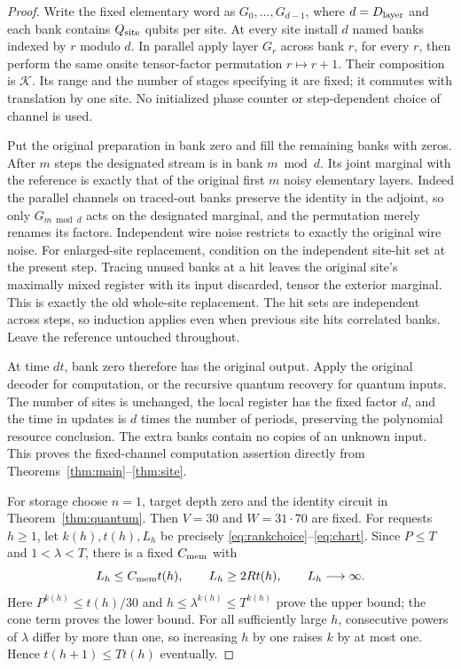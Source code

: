 \begin{proof}
Write the fixed elementary word as $G_0,\ldots,G_{d-1}$, where $d=D_{\rm layer}$ and each bank contains $Q_{\rm site}$ qubits per site. At every site install $d$ named banks indexed by $r$ modulo $d$. In parallel apply layer $G_r$ across bank $r$, for every $r$, then perform the same onsite tensor-factor permutation $r\mapsto r+1$. Their composition is $\mathcal K$. Its range and the number of stages specifying it are fixed; it commutes with translation by one site. No initialized phase counter or step-dependent choice of channel is used.

Put the original preparation in bank zero and fill the remaining banks with zeros. After $m$ steps the designated stream is in bank $m\bmod d$. Its joint marginal with the reference is exactly that of the original first $m$ noisy elementary layers. Indeed the parallel channels on traced-out banks preserve the identity in the adjoint, so only $G_{m\bmod d}$ acts on the designated marginal, and the permutation merely renames its factors. Independent wire noise restricts to exactly the original wire noise. For enlarged-site replacement, condition on the independent site-hit set at the present step. Tracing unused banks at a hit leaves the original site's maximally mixed register with its input discarded, tensor the exterior marginal. This is exactly the old whole-site replacement. The hit sets are independent across steps, so induction applies even when previous site hits correlated banks. Leave the reference untouched throughout.

At time $dt$, bank zero therefore has the original output. Apply the original decoder for computation, or the recursive quantum recovery for quantum inputs. The number of sites is unchanged, the local register has the fixed factor $d$, and the time in updates is $d$ times the number of periods, preserving the polynomial resource conclusion. The extra banks contain no copies of an unknown input. This proves the fixed-channel computation assertion directly from Theorems~\ref{thm:main}--\ref{thm:site}.

For storage choose $n=1$, target depth zero and the identity circuit in Theorem~\ref{thm:quantum}. Then $V=30$ and $W=31\cdot70$ are fixed. For requests $h\ge1$, let $k(h),t(h),L_h$ be precisely \eqref{eq:rankchoice}--\eqref{eq:chart}. Since $P\le T$ and $1<\lambda<T$, there is a fixed $C_{\rm mem}$ with
\[
 L_h\le C_{\rm mem}t(h),\qquad L_h\ge2Rt(h),\qquad
 L_h\longrightarrow\infty.
\]
Here $P^{k(h)}\le t(h)/30$ and $h\le\lambda^{k(h)}\le T^{k(h)}$ prove the upper bound; the cone term proves the lower bound. For all sufficiently large $h$, consecutive powers of $\lambda$ differ by more than one, so increasing $h$ by one raises $k$ by at most one. Hence $t(h+1)\le Tt(h)$ eventually.


\end{proof}
